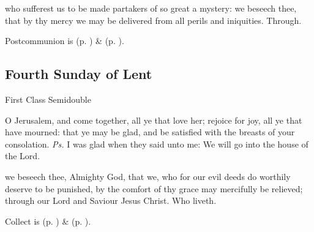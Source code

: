 
\vspace{-0.25\baselineskip}

\postcommunion
{} who sufferest us to be made partakers of so great a mystery: we beseech thee, that by thy mercy we may be delivered from all perils and iniquities. Through.
\begin{rubric}
     Postcommunion is  (p. \pageref{SPSaints}) \&   (p. \pageref{SPLivingDeparted}).
\end{rubric}


\subsection{Fourth Sunday of Lent}
\begin{inhead}
{First Class Semidouble}
\end{inhead}


\vspace{-0.25\baselineskip}

\introit
{} O Jerusalem, and come together, all ye that love her; rejoice for joy, all ye that have mourned: that ye may be glad, and be satisfied with the breasts of your consolation. \textit{Ps.} I was glad when they said unto me: We will go into the house of the Lord.

\vspace{-0.25\baselineskip}

\collect
{} we beseech thee, Almighty God, that we, who for our evil deeds do worthily deserve to be punished, by the comfort of thy grace may mercifully be relieved; through our Lord and Saviour Jesus Christ. Who liveth.
\begin{rubric}
     Collect is  (p. \pageref{SPSaints}) \&   (p. \pageref{SPLivingDeparted}).
\end{rubric}

\vspace{-0.25\baselineskip}


